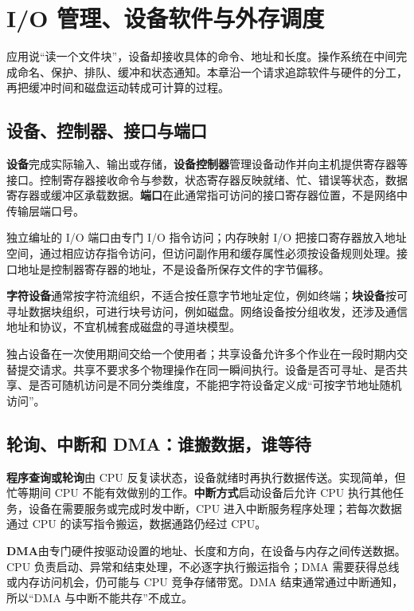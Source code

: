 \chapter{I/O 管理、设备软件与外存调度}\label{os-ch7}

应用说``读一个文件块''，设备却接收具体的命令、地址和长度。操作系统在中间完成命名、保护、排队、缓冲和状态通知。本章沿一个请求追踪软件与硬件的分工，再把缓冲时间和磁盘运动转成可计算的过程。

\section{设备、控制器、接口与端口}\label{os-7-1}

\textbf{设备}完成实际输入、输出或存储，\textbf{设备控制器}管理设备动作并向主机提供寄存器等接口。控制寄存器接收命令与参数，状态寄存器反映就绪、忙、错误等状态，数据寄存器或缓冲区承载数据。\textbf{端口}在此通常指可访问的接口寄存器位置，不是网络中传输层端口号。

独立编址的 I/O 端口由专门 I/O 指令访问；内存映射 I/O 把接口寄存器放入地址空间，通过相应访存指令访问，但访问副作用和缓存属性必须按设备规则处理。接口地址是控制器寄存器的地址，不是设备所保存文件的字节偏移。

\textbf{字符设备}通常按字符流组织，不适合按任意字节地址定位，例如终端；\textbf{块设备}按可寻址数据块组织，可进行块号访问，例如磁盘。网络设备按分组收发，还涉及通信地址和协议，不宜机械套成磁盘的寻道块模型。

独占设备在一次使用期间交给一个使用者；共享设备允许多个作业在一段时期内交替提交请求。共享不要求多个物理操作在同一瞬间执行。设备是否可寻址、是否共享、是否可随机访问是不同分类维度，不能把字符设备定义成``可按字节地址随机访问''。

\section{轮询、中断和 DMA：谁搬数据，谁等待}\label{os-7-2}

\textbf{程序查询或轮询}由 CPU 反复读状态，设备就绪时再执行数据传送。实现简单，但忙等期间 CPU 不能有效做别的工作。\textbf{中断方式}启动设备后允许 CPU 执行其他任务，设备在需要服务或完成时发中断，CPU 进入中断服务程序处理；若每次数据通过 CPU 的读写指令搬运，数据通路仍经过 CPU。

\textbf{DMA}由专门硬件按驱动设置的地址、长度和方向，在设备与内存之间传送数据。CPU 负责启动、异常和结束处理，不必逐字执行搬运指令；DMA 需要获得总线或内存访问机会，仍可能与 CPU 竞争存储带宽。DMA 结束通常通过中断通知，所以``DMA 与中断不能共存''不成立。

